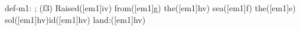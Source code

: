 def-m1: \grealign;
(f3) Raised([em1]iv) from([em1]g) the([em1]hv) sea([em1]f) the([em1]e) sol([em1]hv)id([em1]hv) land:([em1]hv)
